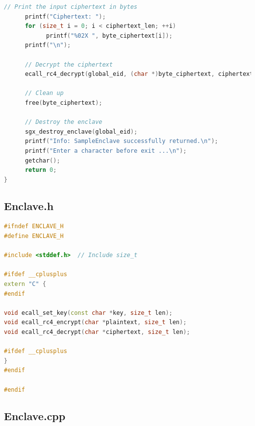 \documentclass{article}
\begin{document}
\begin{lstlisting}[language=c++]
      // Print the input ciphertext in bytes
      printf("Ciphertext: ");
      for (size_t i = 0; i < ciphertext_len; ++i)
            printf("%02X ", byte_ciphertext[i]);
      printf("\n");

      // Decrypt the ciphertext
      ecall_rc4_decrypt(global_eid, (char *)byte_ciphertext, ciphertext_len);

      // Clean up
      free(byte_ciphertext);

      // Destroy the enclave
      sgx_destroy_enclave(global_eid);
      printf("Info: SampleEnclave successfully returned.\n");
      printf("Enter a character before exit ...\n");
      getchar();
      return 0;
}       
\end{lstlisting}

\subsection*{Enclave.h}

\begin{lstlisting}[language=c++]
#ifndef ENCLAVE_H
#define ENCLAVE_H

#include <stddef.h>  // Include size_t

#ifdef __cplusplus
extern "C" {
#endif

void ecall_set_key(const char *key, size_t len);
void ecall_rc4_encrypt(char *plaintext, size_t len);
void ecall_rc4_decrypt(char *ciphertext, size_t len);

#ifdef __cplusplus
}
#endif

#endif
\end{lstlisting}

\subsection*{Enclave.cpp}
\end{document}
